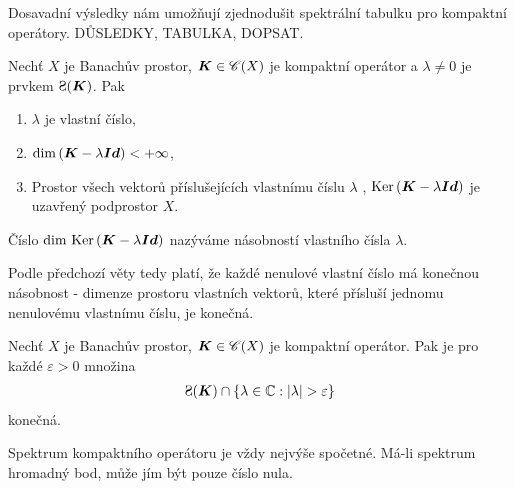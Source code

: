 Dosavadní výsledky nám umožňují zjednodušit spektrální tabulku pro kompaktní operátory. DŮSLEDKY, TABULKA, DOPSAT.

\begin{lemma}
Nechť $X$ je Banachův prostor, $\boldsymbol{K} \in \mathscr{C}(X)$ je kompaktní operátor a $\lambda \neq 0$ je prvkem $\Sp(\map K)$. Pak \begin{enumerate}
    \item $\lambda$ je vlastní číslo,
    \item $\mathrm{dim} \,(\boldsymbol{K} - \lambda \boldsymbol{Id} ) < + \infty$,
    \item Prostor všech vektorů příslušejících vlastnímu číslu $\lambda$ , $\operatorname{Ker}\, (\boldsymbol{K} - \lambda \boldsymbol{Id} )$ je uzavřený podprostor $X$.
\end{enumerate}
\end{lemma}

\begin{definition}
Číslo $\mathrm{dim} \, \operatorname{Ker}\, (\boldsymbol{K} - \lambda \boldsymbol{Id} )$ nazýváme násobností vlastního čísla $\lambda$.
\end{definition}

Podle předchozí věty tedy platí, že každé nenulové vlastní číslo má konečnou násobnost - dimenze prostoru vlastních vektorů, které přísluší jednomu nenulovému vlastnímu číslu, je konečná.

\begin{lemma}
Nechť $X$ je Banachův prostor, $\boldsymbol{K} \in \mathscr{C}(X)$ je kompaktní operátor. Pak je pro každé $\varepsilon>0$ množina \begin{align*}
    \Sp(\map K) \cap \left \lbrace \lambda \in \C : |\lambda| > \varepsilon \right \rbrace
\end{align*}
konečná.
\end{lemma}

\begin{corollary}
Spektrum kompaktního operátoru je vždy nejvýše spočetné. Má-li spektrum hromadný bod, může jím být pouze číslo nula.
\end{corollary}

